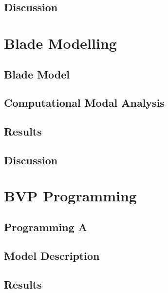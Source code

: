 \documentclass[11pt]{article}
\begin{document}
\subsection{Discussion}

\section{Blade Modelling}
\subsection{Blade Model}
\subsection{Computational Modal Analysis}
\subsection{Results}
\subsection{Discussion}


\section{BVP Programming}
\subsection{Programming A}
\subsection{Model Description}
\subsection{Results}
\end{document}

